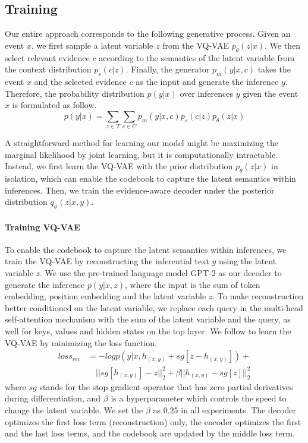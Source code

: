 \documentclass[11pt,a4paper]{article}
\begin{document}
\subsection{Training}
\label{training}
Our entire approach corresponds to the following generative process. Given an event $x$, we first sample a latent variable $z$ from the VQ-VAE $p_\theta(z|x)$. We then select relevant evidence $c$ according to the semantics of the latent variable from the context distribution $p_s(c|z)$. Finally, the generator $p_m(y|x,c)$ takes the event $x$ and the selected evidence $c$ as the input and generate the inference $y$. Therefore, the probability distribution $p(y|x)$ over inferences $y$ given the event $x$ is formulated as follow. 
\begin{equation}
p(y|x)=\sum_{z\in T}\sum_{c\in C}p_m(y|x,c)p_s(c|z)p_\theta(z|x)
\end{equation}

A straightforward method for learning our model might be maximizing the marginal likelihood by joint learning, but it is computationally intractable. 
Instead, we first learn the VQ-VAE with the prior distribution $p_\theta(z|x)$ in isolation, which can enable the codebook to capture the latent semantics within inferences. Then, we train the evidence-aware decoder under the posterior distribution $q_\phi(z|x,y)$.




\paragraph{Training VQ-VAE}
To enable the codebook to capture the latent semantics within inferences, we train the VQ-VAE by reconstructing the inferential text $y$ using the latent variable $z$.  We use the pre-trained language model GPT-2 \cite{radford2019language} as our decoder to generate the inference $p(y|x,z)$, where the input is the sum of token embedding, position embedding and the latent variable $z$. To make reconstruction better conditioned on the latent variable, we replace each query in the multi-head self-attention mechanism with the sum of the latent variable and the query, as well for keys, values and hidden states on the top layer. We follow \citet{van2017neural} to learn the VQ-VAE by minimizing the loss function. 
\begin{equation}
\begin{aligned}
loss_{rec}&=-logp(y|x,h_{(x,y)}+sg[z-h_{(x,y)}])+\\
&\quad  ||sg[h_{(x,y)}]-z||^2_2+\beta||h_{(x,y)}-sg[z]||^2_2
\end{aligned}
\end{equation}
where $sg$ stands for the stop gradient operator that has zero partial derivatives during differentiation, and $\beta$ is a hyperparameter which controls the speed to change the latent variable. We set the $\beta$ as 0.25 in all experiments. The decoder optimizes the first loss term (reconstruction) only, the encoder optimizes the first and the last loss terms, and the codebook are updated by the middle loss term.
\end{document}
